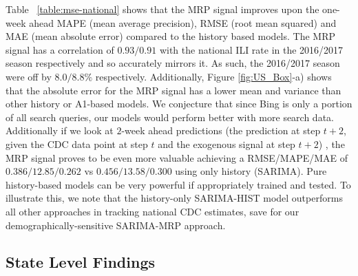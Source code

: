 \documentclass[fleqn,10pt]{wlscirep}
\begin{document}
Table ~\ref{table:mse-national} shows that the MRP signal improves upon the one-week ahead MAPE (mean average precision), RMSE (root mean squared)  and MAE (mean absolute error) compared to the history based models. The MRP signal has a correlation of $0.93/0.91$ with the national ILI rate in the 2016/2017 season respectively and so accurately mirrors it. As such, the 2016/2017 season were off by $8.0/8.8\%$ respectively. Additionally, Figure \ref{fig:US_Box}-a) shows that the absolute error for the MRP signal has a lower mean and variance than other history or A1-based models. We conjecture that since Bing is only a portion of all search queries, our models would perform better with more search data. Additionally if we look at $2$-week ahead predictions (the prediction at step $t+2$, given the CDC data point at step $t$ and the exogenous signal at step $t+2$) , the MRP signal proves to be even more valuable achieving a RMSE/MAPE/MAE of $0.386/12.85/0.262$ vs $0.456/13.58/0.300$ using only history (SARIMA). Pure history-based models can be very powerful if appropriately trained and tested. To illustrate this, we note that the history-only SARIMA-HIST model outperforms all other approaches in tracking national CDC estimates, save for our demographically-sensitive SARIMA-MRP approach.


\subsection*{State Level Findings}

\end{document}
